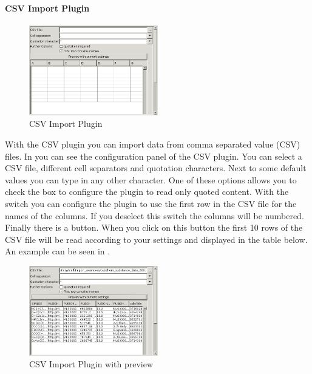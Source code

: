 \paragraph{CSV Import Plugin}
\begin{figure}[ht]
   \centering
   \includegraphics[width=0.5\textwidth]{images/import/csv_import_empty.png}
   \caption{CSV Import Plugin}
   \label{fig:csv_import_empty}
\end{figure} 
With the CSV plugin you can import data from comma
separated value (CSV) files. In  you can see
the configuration panel of the CSV plugin. You can select a CSV file, different
cell separators and quotation characters. Next to some default values you can
type in any other character. One of these options allows you to check the
 box to configure the plugin to read only quoted
content. With the  switch you can configure the
plugin to use the first row in the CSV file for the names of the columns. If
you deselect this switch the columns will be numbered. Finally there is a
 button. When you click on this button the
first 10 rows of the CSV file will be read according to your settings and
displayed in the table below. An example can be seen in
.

\begin{figure}[ht]
   \centering
   \includegraphics[width=0.5\textwidth]{images/import/csv_import_preview.png}
   \caption{CSV Import Plugin with preview}
   \label{fig:csv_import_preview}
\end{figure}

